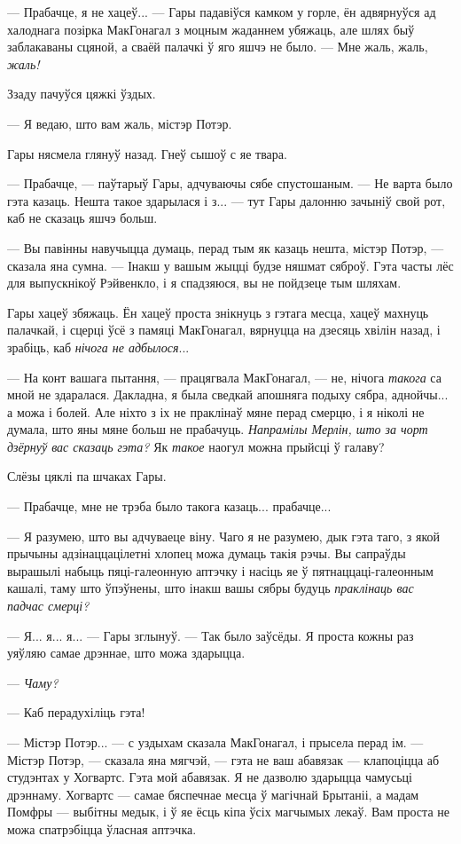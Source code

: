 --- Прабачце, я не хацеў... --- Гары падавіўся камком у горле, ён адвярнуўся ад 
халоднага позірка МакГонагал з моцным жаданнем убяжаць, але шлях быў заблакаваны
сцяной, а сваёй палачкі ў яго яшчэ не было. --- Мне жаль, жаль, \emph{жаль!}

Ззаду пачуўся цяжкі ўздых.

--- Я ведаю, што вам жаль, містэр Потэр.

Гары нясмела глянуў назад. Гнеў сышоў с яе твара. 

--- Прабачце, --- паўтарыў Гары, адчуваючы сябе спустошаным. --- Не варта было гэта
казаць. Нешта такое здарылася і з... --- тут Гары далонню зачыніў свой рот, каб
не сказаць яшчэ больш.

--- Вы павінны навучыцца думаць, перад тым як казаць нешта, містэр Потэр, ---
сказала яна сумна. --- Інакш у вашым жыцці будзе няшмат сяброў. Гэта 
часты лёс
для выпускнікоў Рэйвенкло, і я спадзяюся, вы не пойдзеце тым шляхам.

Гары хацеў збяжаць. Ён хацеў проста знікнуць з гэтага месца, хацеў махнуць 
палачкай, і сцерці ўсё з памяці МакГонагал, вярнуцца на дзесяць хвілін назад, 
і зрабіць, каб \emph{нічога не адбылося}...

--- На конт вашага пытання, --- працягвала МакГонагал, --- не, нічога \emph{такога}
са мной не здаралася. Дакладна, я была сведкай апошняга подыху сябра, аднойчы...
а можа і болей. Але ніхто з іх не праклінаў мяне перад смерцю, і я 
ніколі не думала, што яны мяне больш не прабачуць.
\emph{Напрамілы Мерлін, што за чорт дзёрнуў
вас сказаць гэта?} Як \emph{такое} наогул можна прыйсці ў галаву?

Слёзы цяклі па шчаках Гары.

--- Прабачце, мне не трэба было такога казаць... прабачце...

--- Я разумею, што вы адчуваеце віну. Чаго я не разумею, дык гэта таго, з якой прычыны 
адзінаццацілетні хлопец можа думаць такія рэчы. Вы сапраўды вырашылі набыць 
пяці-галеонную аптэчку і насіць яе ў пятнаццаці-галеонным кашалі, таму што
ўпэўнены, што інакш вашы сябры будуць \emph{праклінаць вас падчас смерці?}

--- Я... я... я... --- Гары зглынуў. --- Так было заўсёды. Я проста кожны раз
уяўляю самае дрэннае, што можа здарыцца.

--- \emph{Чаму?}

--- Каб перадухіліць гэта!

--- Містэр Потэр... --- с уздыхам сказала МакГонагал, і прысела перад ім. --- Містэр
Потэр, --- сказала яна мягчэй, --- гэта не ваш абавязак --- клапоціцца аб студэнтах 
у Хогвартс. Гэта мой абавязак. Я не дазволю здарыцца чамусьці дрэннаму. 
Хогвартс --- самае бяспечнае месца ў магічнай Брытаніі, а мадам Помфры ---
выбітны медык, і ў яе ёсць кіпа ўсіх магчымых лекаў. Вам проста не можа спатрэбіцца
ўласная аптэчка.


